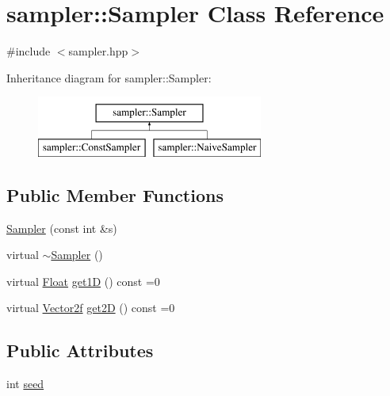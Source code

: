 \hypertarget{classsampler_1_1Sampler}{}\section{sampler\+::Sampler Class Reference}
\label{classsampler_1_1Sampler}


{\ttfamily \#include $<$sampler.\+hpp$>$}

Inheritance diagram for sampler\+::Sampler\+:\begin{figure}[H]
\begin{center}
\leavevmode
\includegraphics[height=2.000000cm]{classsampler_1_1Sampler}
\end{center}
\end{figure}
\subsection*{Public Member Functions}
\begin{DoxyCompactItemize}
\item 
\mbox{\hyperlink{classsampler_1_1Sampler_a2561548f5b35cb8f177f83d817a69c9f}{Sampler}} (const int \&s)
\item 
virtual \mbox{\hyperlink{classsampler_1_1Sampler_af14ed59f9741fef7feec6c5ba8d113c3}{$\sim$\+Sampler}} ()
\item 
virtual \mbox{\hyperlink{cyclop_8hpp_a07afd7094cb489cbd514c76e6f55d34f}{Float}} \mbox{\hyperlink{classsampler_1_1Sampler_a1bf2e7752ddd5b44fd291c04ffad3464}{get1D}} () const =0
\item 
virtual \mbox{\hyperlink{cyclop_8hpp_a0c5eff6545fe0b71d0592c88d930b697}{Vector2f}} \mbox{\hyperlink{classsampler_1_1Sampler_ad326337d2bac30ca6f95d01833d6e932}{get2D}} () const =0
\end{DoxyCompactItemize}
\subsection*{Public Attributes}
\begin{DoxyCompactItemize}
\item 
int \mbox{\hyperlink{classsampler_1_1Sampler_a47b39c5af16956df6781d37dbb602465}{seed}}
\end{DoxyCompactItemize}


